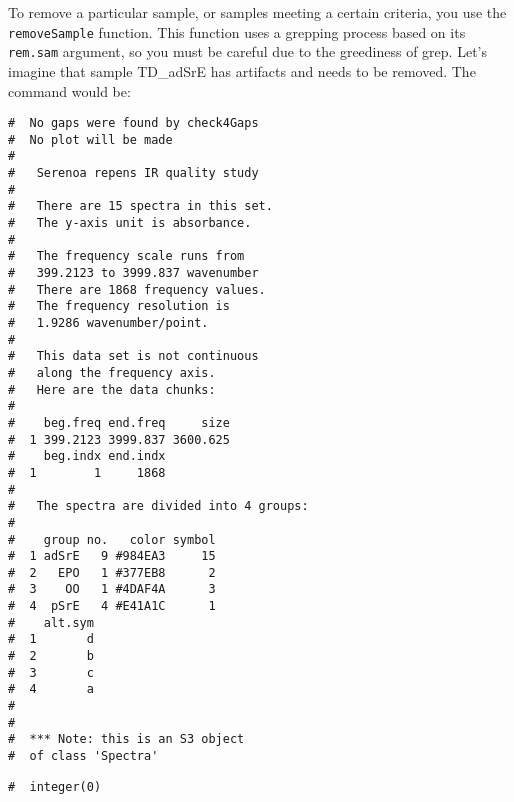 \documentclass[letter,10pt,twocolumn,twoside,printwatermark=false]{pinp}
\begin{document}
To remove a particular sample, or samples meeting a certain criteria,
you use the \texttt{removeSample} function. This function uses a
grepping process based on its \texttt{rem.sam} argument, so you must be
careful due to the greediness of grep. Let's imagine that sample
TD\_adSrE has artifacts and needs to be removed. The command would be:

\begin{Shaded}
\begin{Highlighting}[]
\StringTok{ }
   \NormalTok{(}\NormalTok{))}
\end{Highlighting}
\end{Shaded}

\begin{ShadedResult}
\begin{verbatim}
#  No gaps were found by check4Gaps
#  No plot will be made
#  
#   Serenoa repens IR quality study 
#  
#   There are 15 spectra in this set.
#   The y-axis unit is absorbance.
#  
#   The frequency scale runs from
#   399.2123 to 3999.837 wavenumber
#   There are 1868 frequency values.
#   The frequency resolution is
#   1.9286 wavenumber/point.
#  
#   This data set is not continuous
#   along the frequency axis.
#   Here are the data chunks:
#  
#    beg.freq end.freq     size
#  1 399.2123 3999.837 3600.625
#    beg.indx end.indx
#  1        1     1868
#  
#   The spectra are divided into 4 groups: 
#  
#    group no.   color symbol
#  1 adSrE   9 #984EA3     15
#  2   EPO   1 #377EB8      2
#  3    OO   1 #4DAF4A      3
#  4  pSrE   4 #E41A1C      1
#    alt.sym
#  1       d
#  2       b
#  3       c
#  4       a
#  
#  
#  *** Note: this is an S3 object
#  of class 'Spectra'
\end{verbatim}
\end{ShadedResult}

\begin{Shaded}
\begin{Highlighting}[]
\NormalTok{(}\OperatorTok{$}
\end{Highlighting}
\end{Shaded}

\begin{ShadedResult}
\begin{verbatim}
#  integer(0)
\end{verbatim}
\end{ShadedResult}
\end{document}
